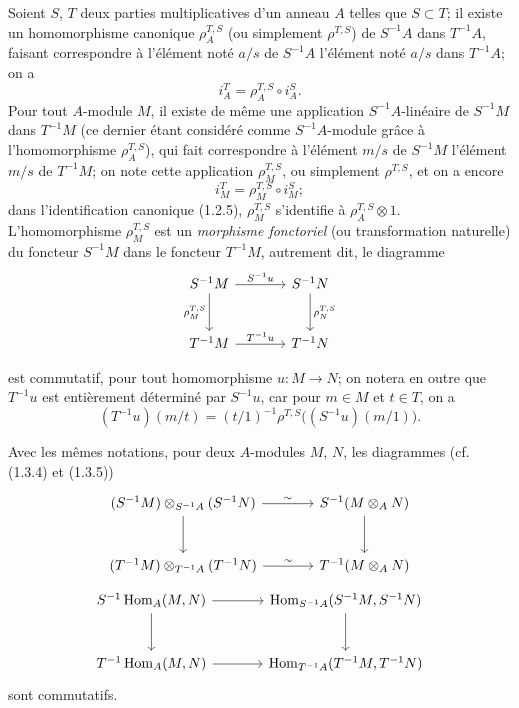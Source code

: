 \begin{env}[1.4.1]
\label{0.1.4.1-fr}
Soient $S$, $T$ deux parties multiplicatives d'un anneau $A$ telles que $S\subset T$; il existe un homomorphisme canonique $\rho_A^{T,S}$ (ou simplement $\rho^{T,S}$) de $S^{-1}A$ dans $T^{-1}A$, faisant correspondre à l'élément noté $a/s$ de $S^{-1}A$ l'élément noté $a/s$ dans $T^{-1}A$; on a
\[
  i_A^T=\rho_A^{T,S}\circ i_A^S.
\]
Pour tout $A$-module $M$, il existe de même une application $S^{-1}A$-linéaire de $S^{-1}M$ dans $T^{-1}M$ (ce dernier étant considéré comme $S^{-1}A$-module grâce à l'homomorphisme $\rho_A^{T,S}$), qui fait correspondre à l'élément $m/s$ de $S^{-1}M$ l'élément $m/s$ de $T^{-1}M$; on note cette application $\rho_M^{T,S}$, ou simplement $\rho^{T,S}$, et on a encore
\[
  i_M^T=\rho_M^{T,S}\circ i_M^S;
\]
dans l'identification canonique (1.2.5), $\rho_M^{T,S}$ s'identifie à $\rho_A^{T,S}\otimes 1$.
L'homomorphisme $\rho_M^{T,S}$ est un \emph{morphisme fonctoriel} (ou transformation naturelle) du foncteur $S^{-1}M$ dans le foncteur $T^{-1}M$, autrement dit, le diagramme
\[
\begin{tikzcd}[column sep=large,row sep=large]
S^{-1}M \arrow[r,"S^{-1}u"] \arrow[d,"\rho_M^{T,S}"'] & S^{-1}N \arrow[d,"\rho_N^{T,S}"] \\
T^{-1}M \arrow[r,"T^{-1}u"] & T^{-1}N
\end{tikzcd}
\]

est commutatif, pour tout homomorphisme $u:M\to N$; on notera en outre que $T^{-1}u$ est entièrement déterminé par $S^{-1}u$, car pour $m\in M$ et $t\in T$, on a
\[
  (T^{-1}u)(m/t)=(t/1)^{-1}\rho^{T,S}\bigl((S^{-1}u)(m/1)\bigr).
\]
\end{env}

\begin{env}[1.4.2]
\label{0.1.4.2-fr}
Avec les mêmes notations, pour deux $A$-modules $M$, $N$, les diagrammes (cf. (1.3.4) et (1.3.5))
\[
\begin{tikzcd}[column sep=large,row sep=large]
(S^{-1}M)\otimes_{S^{-1}A}(S^{-1}N) \arrow[r,"\sim"] \arrow[d]
  & S^{-1}(M\otimes_A N) \arrow[d]
  \\
(T^{-1}M)\otimes_{T^{-1}A}(T^{-1}N) \arrow[r,"\sim"]
  & T^{-1}(M\otimes_A N)
\end{tikzcd}
\]
\[
\begin{tikzcd}[column sep=large,row sep=large]
S^{-1}\operatorname{Hom}_A(M,N) \arrow[r] \arrow[d]
  & \operatorname{Hom}_{S^{-1}A}(S^{-1}M,S^{-1}N) \arrow[d] \\
T^{-1}\operatorname{Hom}_A(M,N) \arrow[r]
  & \operatorname{Hom}_{T^{-1}A}(T^{-1}M,T^{-1}N)
\end{tikzcd}
\]
sont commutatifs.
\end{env}

